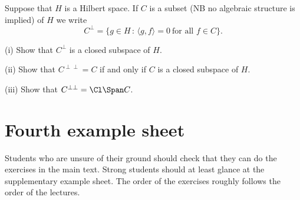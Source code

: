 \begin{exercise}\label{C3.12} Suppose that $H$ is a Hilbert space.
If $C$ is a subset (NB no algebraic structure is implied)
of $H$ we write
\[C^{\perp}=\{g\in H\,:\,\langle g,f\rangle=0\ \text{for all $f\in C$}\}.\]

(i) Show that $C^{\perp}$ is a closed subspace of $H$.

(ii) Show that $C^{\perp\perp}=C$ if and only if $C$ is
a closed subspace of $H$.

(iii) Show that
$C^{\perp\perp}=\Cl\Span C$.
\end{exercise}
\section{Fourth example sheet}
Students who are unsure of  their ground should
check that they can do the exercises in the main text. 
Strong students should at least glance at the supplementary
example sheet. The order of the exercises roughly follows the
order of the lectures.

